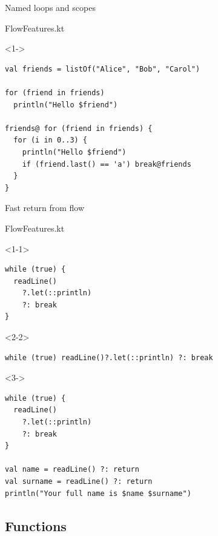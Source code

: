 \documentclass[hyperref={pdfpagelabels=false},xcolor={dvipsnames},compress]{beamer}
\begin{document}
    \begin{frame}[fragile]{Named loops and scopes}
        \begin{exampleblock}{FlowFeatures.kt}
            \begin{onlyenv}<1->
                \begin{lstlisting}
val friends = listOf("Alice", "Bob", "Carol")

for (friend in friends)
  println("Hello $friend")

friends@ for (friend in friends) {
  for (i in 0..3) {
    println("Hello $friend")
    if (friend.last() == 'a') break@friends
  }
}
                \end{lstlisting}
            \end{onlyenv}
        \end{exampleblock}
    \end{frame}

    \begin{frame}[fragile]{Fast return from flow}
        \begin{exampleblock}{FlowFeatures.kt}
            \begin{onlyenv}<1-1>
                \begin{lstlisting}
while (true) {
  readLine()
    ?.let(::println)
    ?: break
}
                \end{lstlisting}
            \end{onlyenv}
            \begin{onlyenv}<2-2>
                \begin{lstlisting}
while (true) readLine()?.let(::println) ?: break
                \end{lstlisting}
            \end{onlyenv}
            \begin{onlyenv}<3->
                \begin{lstlisting}
while (true) {
  readLine()
    ?.let(::println)
    ?: break
}

val name = readLine() ?: return
val surname = readLine() ?: return
println("Your full name is $name $surname")
                \end{lstlisting}
            \end{onlyenv}
        \end{exampleblock}
    \end{frame}

    \subsection{Functions}
\end{document}
